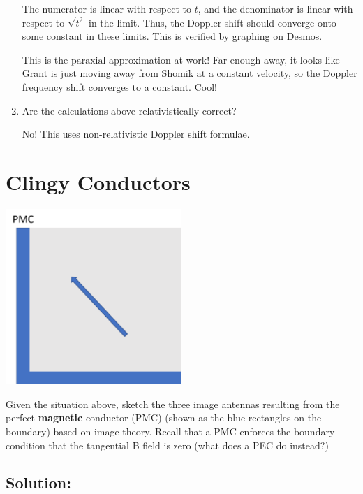 \documentclass{article}
\begin{document}
\begin{enumerate}[label=(\alph*)]
    The numerator is linear with respect to $t$, and the denominator is linear with respect to $\sqrt{t^2}$ in the limit. Thus, the Doppler shift should converge onto some constant in these limits. This is verified by graphing on Desmos.

    This is the $\boxed{\text{paraxial}}$ approximation at work! Far enough away, it looks like Grant is just moving away from Shomik at a constant velocity, so the Doppler frequency shift converges to a constant. Cool!

    \vfill

    \item Are the calculations above relativistically correct?

    No! This uses non-relativistic Doppler shift formulae.
\end{enumerate}

\newpage

\section{Clingy Conductors}

\begin{center}
\includegraphics[width=0.5\textwidth]{figures/PMC Prompt.jpg}
\end{center}

Given the situation above, sketch the three image antennas resulting from the perfect \textbf{magnetic} conductor (PMC) (shown as the blue rectangles on the boundary) based on image theory. Recall that a PMC enforces the boundary condition that the tangential B field is zero (what does a PEC do instead?)

\subsection{Solution:}
\end{document}
